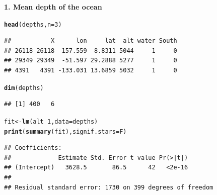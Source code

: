 \documentclass[10pt]{beamer}\usepackage[]{graphicx}\usepackage[]{color}
\makeatletter
\newcommand{\hlnum}[1]{\textcolor[rgb]{0.686,0.059,0.569}{#1}}%
\newcommand{\hlopt}[1]{\textcolor[rgb]{0,0,0}{#1}}%
\newcommand{\hlstd}[1]{\textcolor[rgb]{0.345,0.345,0.345}{#1}}%
\newcommand{\hlkwb}[1]{\textcolor[rgb]{0.69,0.353,0.396}{#1}}%
\newcommand{\hlkwc}[1]{\textcolor[rgb]{0.333,0.667,0.333}{#1}}%
\newcommand{\hlkwd}[1]{\textcolor[rgb]{0.737,0.353,0.396}{\textbf{#1}}}%
\newenvironment{kframe}{%
 \def\at@end@of@kframe{}%
 \ifinner\ifhmode%
  \def\at@end@of@kframe{\end{minipage}}%
  \begin{minipage}{\columnwidth}%
 \fi\fi%
 \def\FrameCommand##1{\hskip\@totalleftmargin \hskip-\fboxsep
 \colorbox{shadecolor}{##1}\hskip-\fboxsep
     \hskip-\linewidth \hskip-\@totalleftmargin \hskip\columnwidth}%
 \MakeFramed {\advance\hsize-\width
   \@totalleftmargin\z@ \linewidth\hsize
   \@setminipage}}%
 {\par\unskip\endMakeFramed%
 \at@end@of@kframe}
\newenvironment{knitrout}{}{} %
\makeatother
\begin{document}
\begin{frame}
\vspace*{-1.0in}
\textbf{1. Mean depth of the ocean}


\begin{knitrout}\tiny
{}\color{fgcolor}\begin{kframe}
\begin{alltt}
\hlkwd{head}\hlstd{(depths,} \hlkwc{n}\hlstd{=}\hlnum{3}\hlstd{)}
\end{alltt}
\begin{verbatim}
##           X      lon     lat  alt water South
## 26118 26118  157.559  8.8311 5044     1     0
## 29349 29349  -51.597 29.2888 5277     1     0
## 4391   4391 -133.031 13.6859 5032     1     0
\end{verbatim}
\begin{alltt}
\hlkwd{dim}\hlstd{(depths)}
\end{alltt}
\begin{verbatim}
## [1] 400   6
\end{verbatim}
\begin{alltt}
\hlstd{fit} \hlkwb{<-} \hlkwd{lm}\hlstd{(alt} \hlopt{~} \hlnum{1}\hlstd{,} \hlkwc{data} \hlstd{= depths)}
\hlkwd{print}\hlstd{(}\hlkwd{summary}\hlstd{(fit),} \hlkwc{signif.stars} \hlstd{= F)}
\end{alltt}
\begin{verbatim}
## Coefficients:
##             Estimate Std. Error t value Pr(>|t|)
## (Intercept)   3628.5       86.5      42   <2e-16
## 
## Residual standard error: 1730 on 399 degrees of freedom
\end{verbatim}
\end{kframe}
\end{knitrout}


\end{frame}
\end{document}
